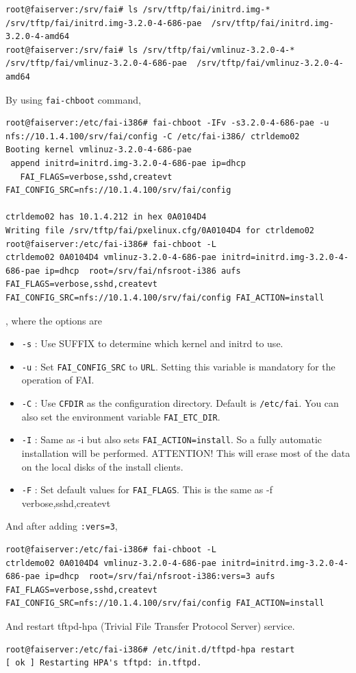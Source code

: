 \documentclass[11pt
  , a4paper
  , article
  , oneside
]{memoir}
\begin{document}
\begin{lstlisting}
root@faiserver:/srv/fai# ls /srv/tftp/fai/initrd.img-* 
/srv/tftp/fai/initrd.img-3.2.0-4-686-pae  /srv/tftp/fai/initrd.img-3.2.0-4-amd64
root@faiserver:/srv/fai# ls /srv/tftp/fai/vmlinuz-3.2.0-4-* 
/srv/tftp/fai/vmlinuz-3.2.0-4-686-pae  /srv/tftp/fai/vmlinuz-3.2.0-4-amd64
\end{lstlisting}
By using \texttt{fai-chboot} command, 
\begin{lstlisting}
root@faiserver:/etc/fai-i386# fai-chboot -IFv -s3.2.0-4-686-pae -u nfs://10.1.4.100/srv/fai/config -C /etc/fai-i386/ ctrldemo02
Booting kernel vmlinuz-3.2.0-4-686-pae
 append initrd=initrd.img-3.2.0-4-686-pae ip=dhcp  
   FAI_FLAGS=verbose,sshd,createvt FAI_CONFIG_SRC=nfs://10.1.4.100/srv/fai/config

ctrldemo02 has 10.1.4.212 in hex 0A0104D4
Writing file /srv/tftp/fai/pxelinux.cfg/0A0104D4 for ctrldemo02
root@faiserver:/etc/fai-i386# fai-chboot -L
ctrldemo02 0A0104D4 vmlinuz-3.2.0-4-686-pae initrd=initrd.img-3.2.0-4-686-pae ip=dhcp  root=/srv/fai/nfsroot-i386 aufs  FAI_FLAGS=verbose,sshd,createvt FAI_CONFIG_SRC=nfs://10.1.4.100/srv/fai/config FAI_ACTION=install
\end{lstlisting}
, where the options are 
\begin{itemize}
\item \texttt{-s} : Use SUFFIX to determine which kernel and initrd to use.
\item \texttt{-u} : Set \texttt{FAI\_CONFIG\_SRC} to \texttt{URL}. Setting this variable is mandatory for the operation of FAI.
\item \texttt{-C} : Use \texttt{CFDIR} as the configuration directory. Default is \texttt{/etc/fai}. You can also set the environment variable \texttt{FAI\_ETC\_DIR}.
\item \texttt{-I} : Same as -i but also sets \texttt{FAI\_ACTION=install}. So a fully automatic installation will be performed. ATTENTION! This will erase most of the data  on  the local disks of the install clients.
\item \texttt{-F} : Set default values for \texttt{FAI\_FLAGS}. This is the same as -f verbose,sshd,createvt
\end{itemize}
And after adding \texttt{:vers=3}, 
\begin{lstlisting}
root@faiserver:/etc/fai-i386# fai-chboot -L
ctrldemo02 0A0104D4 vmlinuz-3.2.0-4-686-pae initrd=initrd.img-3.2.0-4-686-pae ip=dhcp  root=/srv/fai/nfsroot-i386:vers=3 aufs  FAI_FLAGS=verbose,sshd,createvt FAI_CONFIG_SRC=nfs://10.1.4.100/srv/fai/config FAI_ACTION=install
\end{lstlisting}
And restart tftpd-hpa (Trivial File Transfer Protocol Server) service. 
\begin{lstlisting}
root@faiserver:/etc/fai-i386# /etc/init.d/tftpd-hpa restart
[ ok ] Restarting HPA's tftpd: in.tftpd.
\end{lstlisting}
\end{document}
